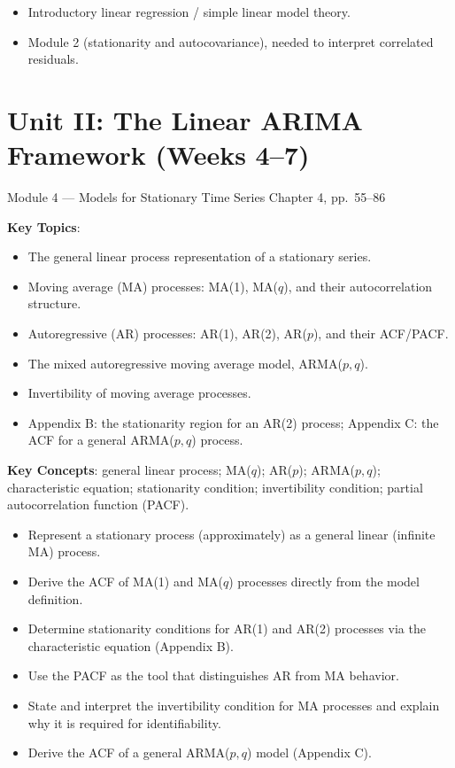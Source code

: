 \documentclass[11pt]{article}
\newcommand{\keytopics}{\textbf{\color{modblue}Key Topics}}
\newcommand{\keyconcepts}{\textbf{\color{modblue}Key Concepts}}
\begin{document}
\begin{prereqs}
\begin{itemize}
  \item Introductory linear regression / simple linear model theory.
  \item Module 2 (stationarity and autocovariance), needed to interpret correlated residuals.
\end{itemize}
\end{prereqs}

\newpage
\section{Unit II: The Linear ARIMA Framework (Weeks 4--7)}

\begin{moduletitle}{Module 4 --- Models for Stationary Time Series}
\small Chapter 4, pp.\ 55--86
\end{moduletitle}

\keytopics:
\begin{itemize}
  \item The general linear process representation of a stationary series.
  \item Moving average (MA) processes: MA(1), MA($q$), and their autocorrelation structure.
  \item Autoregressive (AR) processes: AR(1), AR(2), AR($p$), and their ACF/PACF.
  \item The mixed autoregressive moving average model, ARMA($p,q$).
  \item Invertibility of moving average processes.
  \item Appendix B: the stationarity region for an AR(2) process; Appendix C: the ACF for a general ARMA($p,q$) process.
\end{itemize}

\keyconcepts: general linear process; MA($q$); AR($p$); ARMA($p,q$); characteristic equation; stationarity condition; invertibility condition; partial autocorrelation function (PACF).

\begin{objectives}
\begin{itemize}
  \item Represent a stationary process (approximately) as a general linear (infinite MA) process.
  \item Derive the ACF of MA(1) and MA($q$) processes directly from the model definition.
  \item Determine stationarity conditions for AR(1) and AR(2) processes via the characteristic equation (Appendix B).
  \item Use the PACF as the tool that distinguishes AR from MA behavior.
  \item State and interpret the invertibility condition for MA processes and explain why it is required for identifiability.
  \item Derive the ACF of a general ARMA($p,q$) model (Appendix C).
\end{itemize}
\end{objectives}
\end{document}
